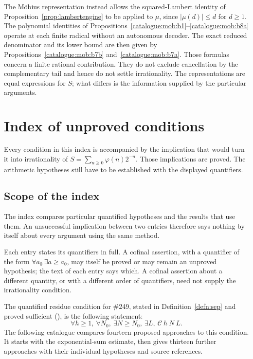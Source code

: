 The M\"obius representation instead allows the squared-Lambert identity
of Proposition~\ref{prop:lambertengine}
to be applied to $\mu$, since $|\mu(d)|\le d$ for $d\ge1$. The
polynomial identities of
Propositions~\ref{catalogue:mob:b1}--\ref{catalogue:mob:b8a}
operate at each finite radical without an autonomous decoder. The exact
reduced denominator and its lower bound are then given by
Propositions~\ref{catalogue:mob:b7b} and~\ref{catalogue:mob:b7a}.
Those formulas concern a finite rational contribution. They do not
exclude cancellation by the complementary tail and hence do not settle
irrationality. The representations are equal expressions for $S$;
what differs is the information supplied by the particular arguments.
\section{Index of unproved conditions}

Every condition in this index is accompanied by the implication that
would turn it into irrationality of $S=\sum_{n\ge0}\varphi(n)2^{-n}$.
Those implications are proved. The arithmetic hypotheses still have
to be established with the displayed quantifiers.

\subsection{Scope of the index}

The index compares particular quantified hypotheses and the results
that use them. An unsuccessful implication between two entries
therefore says nothing by itself about every argument using the same
method.

Each entry states its quantifiers in full. A cofinal assertion, with a
quantifier of the form $\forall a_0\ \exists a\ge a_0$, may itself be
proved or may remain an unproved hypothesis; the text of each entry says
which. A cofinal assertion about a different quantity, or with a
different order of quantifiers, need not supply the irrationality
condition.

The quantified residue condition for \#249, stated in Definition~\ref{defn:sep} and proved sufficient
(), is the
following statement:
\[
  \forall h \ge 1,\ \forall N_0,\ \exists N \ge N_0,\ \exists L,\ \mathcal{C}\ h\ N\ L .
\]
The following catalogue compares fourteen proposed approaches to this
condition. It starts with the exponential-sum estimate, then gives thirteen
further approaches with their individual hypotheses and source references.

